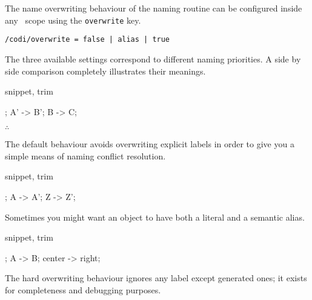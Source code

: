 The name overwriting behaviour of the naming routine can be configured
inside any \CoDi\ scope using the \lstinline!overwrite! key.

\begin{lstlisting}[style=metacode]
/codi/overwrite = false | alias | true
\end{lstlisting}

The three available settings correspond to different naming priorities.
A side by side comparison completely illustrates their meanings.

\begin{tcblisting}{snippet, trim}
\begin{codi}
; %
\mor A' -> B';
\mor B  -> C;
\end{codi}
\end{tcblisting}

\hfill$\therefore$\hfill\null

The default behaviour avoids overwriting explicit labels in order
to give you a simple means of naming conflict resolution.

\begin{tcblisting}{snippet, trim}
\begin{codi}[tetragonal]
;
\mor A -> A';
\mor Z -> Z';
\end{codi}
\end{tcblisting}

Sometimes you might want an object to have both a literal and a
semantic alias.

\begin{tcblisting}{snippet, trim}
\begin{codi}
;
\mor A -> B;
\mor center -> right;
\end{codi}
\end{tcblisting}

The hard overwriting behaviour ignores any label except generated
ones; it exists for completeness and debugging purposes.
